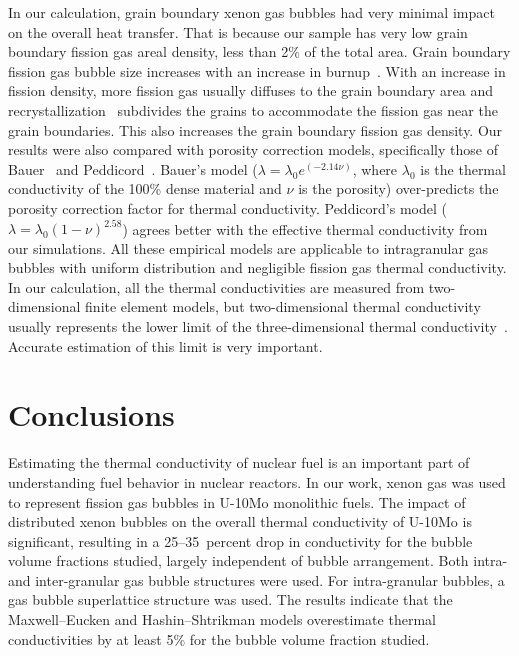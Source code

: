 In our calculation, grain boundary xenon gas bubbles had very minimal impact on the overall heat transfer. That is because our sample has very low grain boundary fission gas areal density, less than 2$\%$ of the total area. Grain boundary fission gas bubble size increases with an increase in burnup~\cite{kim2011fission}.
With an increase in fission density, more fission gas usually diffuses to the grain boundary area and recrystallization~\cite{kim2013recrystallization} subdivides the grains to accommodate the fission gas near the grain boundaries.
This also increases the grain boundary fission gas density. Our results were also compared with porosity correction models, specifically those of Bauer~\cite{bauer1995pile} and Peddicord~\cite{peddicord1978porosity}. Bauer's model ($\lambda=\lambda_0 e^{(-2.14\nu)}$, where $\lambda_0$ is the thermal conductivity of the 100\% dense material and $\nu$ is the porosity) over-predicts the porosity correction factor for thermal conductivity. Peddicord's model ($\lambda=\lambda_0(1-\nu)^{2.58}$) agrees better with the effective thermal conductivity from our simulations. All these empirical models are applicable to intragranular gas bubbles with uniform distribution and negligible fission gas thermal conductivity. In our calculation, all the thermal conductivities are measured from two-dimensional finite element models, but two-dimensional thermal conductivity usually represents the lower limit of the three-dimensional thermal conductivity~\cite{bakker1995determination}. Accurate estimation of this limit is very important. 


\section{\label{sec:conclusion}Conclusions}
Estimating the thermal conductivity of nuclear fuel is an important part of understanding fuel behavior in nuclear reactors. In our work, xenon gas was used to represent fission gas bubbles in U-10Mo monolithic fuels. The impact of distributed xenon bubbles on the overall thermal conductivity of U-10Mo is significant, resulting in a 25--35~percent drop in conductivity for the bubble volume fractions studied, largely independent of bubble arrangement. Both intra- and inter-granular gas bubble structures were used. For intra-granular bubbles, a gas bubble superlattice structure was used. The results indicate that the Maxwell--Eucken and Hashin--Shtrikman models overestimate thermal conductivities by at least 5\% for the bubble volume fraction studied.

